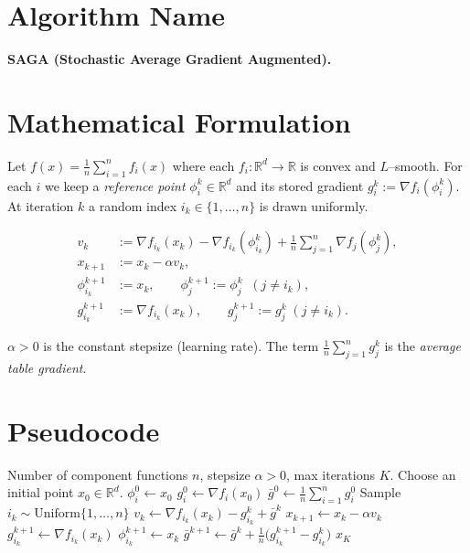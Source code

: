 \documentclass{article}
\begin{document}
\section*{Algorithm Name}
\textbf{SAGA (Stochastic Average Gradient Augmented).}

\section*{Mathematical Formulation}
Let $f(x)=\frac{1}{n}\sum_{i=1}^{n}f_i(x)$ where each $f_i:\mathbb{R}^d\rightarrow\mathbb{R}$ is convex and $L$–smooth.  
For each $i$ we keep a \emph{reference point} $\phi_i^k\in\mathbb{R}^d$ and its stored gradient $g_i^k:=\nabla f_i(\phi_i^k)$.  
At iteration $k$ a random index $i_k\in\{1,\dots,n\}$ is drawn uniformly.

\[
\begin{aligned}
v_k &:= \nabla f_{i_k}(x_k)-\nabla f_{i_k}(\phi_{i_k}^k)+\frac{1}{n}\sum_{j=1}^{n}\nabla f_j(\phi_j^k) ,\\[4pt]
x_{k+1} &:= x_k-\alpha v_k ,\\[4pt]
\phi_{i_k}^{k+1} &:= x_k ,\qquad
\phi_j^{k+1}:=\phi_j^{k}\;\;(j\neq i_k),\\[4pt]
g_{i_k}^{k+1} &:= \nabla f_{i_k}(x_k),\qquad
g_j^{k+1}:=g_j^{k}\;(j\neq i_k).
\end{aligned}
\]

$\alpha>0$ is the constant stepsize (learning rate).  
The term $\frac{1}{n}\sum_{j=1}^{n}g_j^{k}$ is the \emph{average table gradient}.

\section*{Pseudocode}
\begin{algorithm}[H]
\caption{SAGA}
\begin{algorithmic}[1]
\Require Number of component functions $n$, stepsize $\alpha>0$, max iterations $K$.
\State Choose an initial point $x_0\in\mathbb{R}^d$.
    \State $\phi_i^{0}\gets x_0$ 
    \State $g_i^{0}\gets \nabla f_i(x_0)$
\EndFor
\State $\bar g^{0}\gets \frac{1}{n}\sum_{i=1}^{n}g_i^{0}$ 
    \State Sample $i_k\sim\text{Uniform}\{1,\dots,n\}$
    \State $v_k\gets \nabla f_{i_k}(x_k)-g_{i_k}^{k}+\bar g^{k}$
    \State $x_{k+1}\gets x_k-\alpha v_k$
    \State $g_{i_k}^{k+1}\gets \nabla f_{i_k}(x_k)$
    \State $\phi_{i_k}^{k+1}\gets x_k$
    \State $\bar g^{k+1}\gets \bar g^{k}+\frac{1}{n}\bigl(g_{i_k}^{k+1}-g_{i_k}^{k}\bigr)$
\EndFor
\State \Return $x_{K}$
\end{algorithmic}
\end{algorithm}
\end{document}
